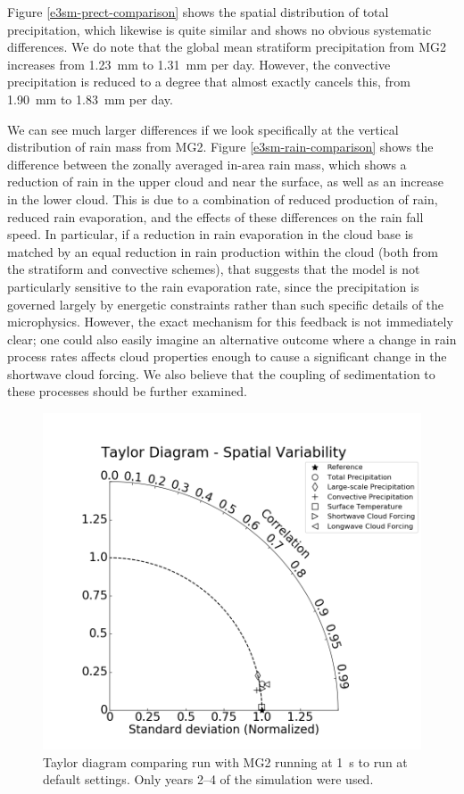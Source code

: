 \documentclass [11pt, proquest] {uwthesis}[2020/02/24]
\begin{document}
Figure \ref{e3sm-prect-comparison} shows the spatial distribution of total precipitation, which likewise is quite similar and shows no obvious systematic differences. We do note that the global mean stratiform precipitation from MG2 increases from \SI{1.23}{\milli\meter} to \SI{1.31}{\milli\meter} per day. However, the convective precipitation is reduced to a degree that almost exactly cancels this, from \SI{1.90}{\milli\meter} to \SI{1.83}{\milli\meter} per day.

We can see much larger differences if we look specifically at the vertical distribution of rain mass from MG2. Figure \ref{e3sm-rain-comparison} shows the difference between the zonally averaged in-area rain mass, which shows a reduction of rain in the upper cloud and near the surface, as well as an increase in the lower cloud. This is due to a combination of reduced production of rain, reduced rain evaporation, and the effects of these differences on the rain fall speed. In particular, if a reduction in rain evaporation in the cloud base is matched by an equal reduction in rain production within the cloud (both from the stratiform and convective schemes), that suggests that the model is not particularly sensitive to the rain evaporation rate, since the precipitation is governed largely by energetic constraints rather than such specific details of the microphysics. However, the exact mechanism for this feedback is not immediately clear; one could also easily imagine an alternative outcome where a change in rain process rates affects cloud properties enough to cause a significant change in the shortwave cloud forcing. We also believe that the coupling of sedimentation to these processes should be further examined.

\begin{figure}[htbp]
  \includegraphics[width=6.5in]{./ANN_metrics_taylor_diag.png}
  \caption[Taylor diagram comparing an EAMv1 simulation with reduced MG2 substep to a control run]{Taylor diagram comparing run with MG2 running at \SI{1}{\second} to run at default settings. Only years \numrange{2}{4} of the simulation were used.}
  \label{e3sm-taylor}
\end{figure}
\end{document}
